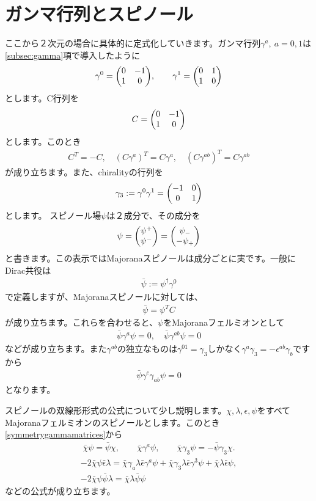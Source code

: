 \documentclass[report,paper=a4, fontsize=12pt, line_length=16cm, number_of_lines=33,dvipdfmx]{jlreq}
\numberwithin{equation}{chapter}
\numberwithin{equation}{section}
\newcommand{\psib}{\bar{\psi}}
\newcommand{\chib}{\bar{\chi}}
\newcommand{\epsilonb}{\bar{\epsilon}}
\begin{document}
\section{ガンマ行列とスピノール}
ここから２次元の場合に具体的に定式化していきます。ガンマ行列$\gamma^{a},\ a=0,1$は\ref{subsec:gamma}項で導入したように
\begin{align}
  \gamma^{0}=
  \mqty(0 & -1 \\
    1 &0),\qquad
  \gamma^{1}=
  \mqty(0 & 1 \\
    1 &0)
\end{align}
とします。C行列を
\begin{align}
  C=\mqty(0 & -1 \\
  1 &0)
\end{align}
とします。このとき
\begin{align}
  C^{T}=-C,\quad (C\gamma^{a})^{T}=C\gamma^{a},\quad (C\gamma^{ab})^{T}=C\gamma^{ab}\label{symmetrygammamatrices}
\end{align}
が成り立ちます。また、chiralityの行列を
\begin{align}
  \gamma_3:=\gamma^{0}\gamma^{1}=\mqty(
    -1 & 0\\
    0 & 1
  )
\end{align}
とします。
スピノール場$\psi$は２成分で、その成分を
\begin{align}
  \psi
  =\mqty(\psi^{+}\\ \psi^{-})
  =\mqty(\psi_{-}\\ -\psi_{+})
\end{align}
と書きます。この表示ではMajoranaスピノールは成分ごとに実です。一般にDirac共役は
\begin{align}
  \psib:=\psi^{\dag}\gamma^{0}
\end{align}
で定義しますが、Majoranaスピノールに対しては、
\begin{align}
  \psib=\psi^{T}C
\end{align}
が成り立ちます。これらを合わせると、$\psi$をMajoranaフェルミオンとして
\begin{align}
  \psib \gamma^a \psi=0,\quad \psib \gamma^{ab}\psi=0
\end{align}
などが成り立ちます。また$\gamma^{ab}$の独立なものは$\gamma^{01}=\gamma_3$しかなく$\gamma^{a}\gamma_3=-\epsilon^{ab}\gamma_{b}$ですから
\begin{align}
  \psib \gamma^c\gamma_{ab}\psi=0\label{vanishingspinconnectionterm}
\end{align}
となります。

スピノールの双線形形式の公式について少し説明します。$\chi,\lambda,\epsilon,\psi$をすべてMajoranaフェルミオンのスピノールとします。このとき\eqref{symmetrygammamatrices}から
\begin{align}
  \chib \psi = \psib \chi,\qquad \chib \gamma^{a}\psi,\qquad \chib \gamma_3 \psi = -\psib \gamma_3 \chi.
\end{align}
\begin{align}
  -2\chib \psi \epsilonb \lambda =
  \chib \gamma_{a} \lambda \epsilonb \gamma^{a}\psi+
  \chib \gamma_{3} \lambda \epsilonb \gamma^{3}\psi+
  \chib \lambda \epsilonb \psi,\\
  -2\chib\psi \psib \lambda=\chib \lambda \psib \psi
\end{align}
などの公式が成り立ちます。
\end{document}
